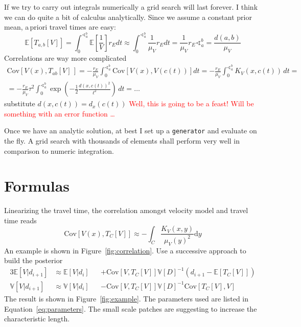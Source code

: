 \documentclass[11pt]{article}
\newcommand\worries[1]{\textcolor{red}{#1}}
\newcommand\Mean[1]{\mathbb{E}\!\left[#1\right]}
\newcommand\Var[1]{\mathbb{V}\!\left[#1\right]}
\newcommand\Cov[2]{\mathrm{Cov}\!\left[#1,#2\right]}
\begin{document}
If we try to carry out integrals numerically a grid search will last forever.
I think we can do quite a bit of calculus analytically.
Since we assume a constant prior mean, a\,priori travel times are easy:
\begin{equation}
    \Mean{T_{a,b}[V]}
    = \int_0^{\sphericalangle_a^b} \Mean{\frac1V} r_E d t
    \approx \int_0^{\sphericalangle_a^b} \frac1{\mu_V} r_E d t
    = \frac1{\mu_V} r_E \sphericalangle_a^b
    = \frac{d(a,b)}{\mu_V}
\end{equation}
Correlations are way more complicated
\begin{multline}
    \Cov{V(x)}{T_{ab}[V]\,} =
   -\frac{r_E}{\mu_V} \int_0^{\sphericalangle_a^b} \Cov{V(x)}{V(c(t))} d t =
   -\frac{r_E}{\mu_V} \int_0^{\sphericalangle_a^b} K_V(x,c(t))\, d t =
   \\ =
   -\frac{r_E}{\mu_V} \tau^2 \int_0^{\sphericalangle_a^b} \exp\!\left(-\frac 12 \frac{d(x,c(t))^2}{\ell^2}\right)\, d t = \dots
\end{multline}
substitute $d(x,c(t)) = d_x(c(t))$
\worries{Well, this is going to be a feast! Will be something with an error function \dots }

Once we have an analytic solution, at best I set up a \texttt{generator} and evaluate on the fly.
A grid search with thousands of elements shall perform very well in comparison to numeric integration.



\section{Formulas}

Linearizing the travel time, the correlation amongst velocity model and travel time reads
\begin{equation}
    \Cov{V(x)}{T_C[V]} \approx -\int_C \frac{K_V(x,y)}{\mu_V(y)^2}  \mathrm d y
\end{equation}
An example is shown in Figure~\ref{fig:correlation}.
Use a successive approach to build the posterior
\begin{alignat}{3}
    \Mean{V|d_{i+1}} &\approx \Mean{V|d_i} &&+ \Cov{V}{T_C[V]}\Var{D}^{-1} \left(d_{i+1}-\Mean{T_C[V]}\right)
    \\
    \Var{V|d_{i+1}}  &\approx \Var{V|d_i}  &&- \Cov{V}{T_C[V]}\Var{D}^{-1}  \Cov{T_C[V]}{V}
\end{alignat}
The result is shown in Figure~\ref{fig:example}. The parameters used are listed in Equation~\ref{eq:parameters}.
The small scale patches are suggesting to increase the characteristic length.
\end{document}
